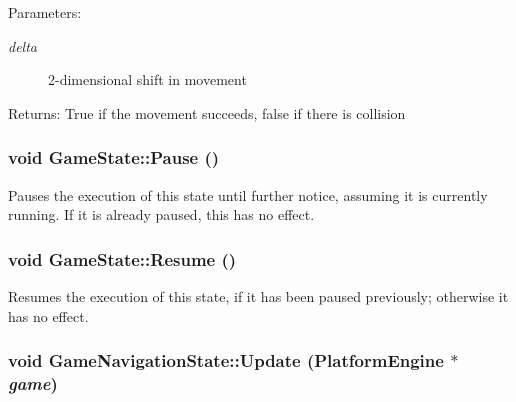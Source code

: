 \begin{Desc}
\item[Parameters:]
\begin{description}
\item[{\em delta}]2-dimensional shift in movement \end{description}
\end{Desc}
\begin{Desc}
\item[Returns:]True if the movement succeeds, false if there is collision \end{Desc}
\hypertarget{class_game_state_0c47c6969a4e0bb32d6cdf7bf9376817}{
\subsubsection[{Pause}]{\setlength{\rightskip}{0pt plus 5cm}void GameState::Pause ()}}
\label{dd/d87/class_game_state_0c47c6969a4e0bb32d6cdf7bf9376817}


Pauses the execution of this state until further notice, assuming it is currently running. If it is already paused, this has no effect. \hypertarget{class_game_state_d12ece3c3fb066281b73b07a315f04e8}{
\subsubsection[{Resume}]{\setlength{\rightskip}{0pt plus 5cm}void GameState::Resume ()}}
\label{dd/d87/class_game_state_d12ece3c3fb066281b73b07a315f04e8}


Resumes the execution of this state, if it has been paused previously; otherwise it has no effect. \hypertarget{class_game_navigation_state_90f5e6d6287a875d8f2737180f46a004}{
\subsubsection[{Update}]{\setlength{\rightskip}{0pt plus 5cm}void GameNavigationState::Update ({\bf PlatformEngine} $\ast$ {\em game})}}
\label{de/d2a/class_game_navigation_state_90f5e6d6287a875d8f2737180f46a004}


